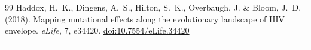 \documentclass[11pt,a4paper]{article}
\begin{document}
\begin{thebibliography}{99}
Haddox, H.~K., Dingens, A.~S., Hilton, S.~K., Overbaugh, J. \& Bloom, J.~D. (2018).
\newblock Mapping mutational effects along the evolutionary landscape of HIV envelope.
\newblock \textit{eLife}, 7, e34420.
\newblock \href{https://doi.org/10.7554/eLife.34420}{doi:10.7554/eLife.34420}

\end{thebibliography}
\endgroup

\vspace{1.5em}
\begin{center}
\rule{0.4\textwidth}{0.4pt}
\end{center}
\end{document}

